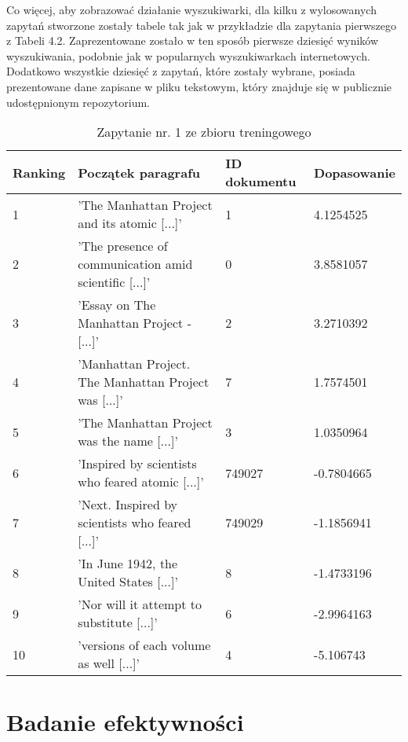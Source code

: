 \newpage

Co więcej, aby zobrazować działanie wyszukiwarki, dla kilku z wylosowanych zapytań stworzone zostały tabele tak jak w przykładzie dla zapytania pierwszego z Tabeli 4.2. Zaprezentowane zostało w ten sposób pierwsze dziesięć wyników wyszukiwania, podobnie jak w popularnych wyszukiwarkach internetowych. Dodatkowo wszystkie dziesięć z zapytań, które zostały wybrane, posiada prezentowane dane zapisane w pliku tekstowym, który znajduje się w publicznie udostępnionym repozytorium. 

\begin{table}[htp]
\centering
\caption{Zapytanie nr. 1 ze zbioru treningowego}
\vspace*{5mm}
\begin{tabular}{llll}
   Ranking & Początek paragrafu & ID dokumentu & Dopasowanie \\
   \hline
    1 & 'The Manhattan Project and its atomic [...]' & 1 & 4.1254525 \\
    2 & 'The presence of communication amid scientific [...]' & 0 &  3.8581057\\
    3 & 'Essay on The Manhattan Project - [...]' & 2 & 3.2710392 \\
    4 & 'Manhattan Project. The Manhattan Project was [...]' & 7 & 1.7574501 \\
    5 & 'The Manhattan Project was the name [...]' & 3 & 1.0350964 \\
    6 & 'Inspired by scientists who feared atomic [...]' & 749027 &  -0.7804665 \\
    7 & 'Next. Inspired by scientists who feared  [...]' & 749029 & -1.1856941 \\
    8 & 'In June 1942, the United States [...]' & 8 & -1.4733196 \\
    9 & 'Nor will it attempt to substitute [...]' & 6 & -2.9964163 \\
    10 & 'versions of each volume as well [...]' & 4 & -5.106743 \\

\end{tabular}
\end{table}


\section{Badanie efektywności}

